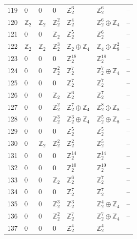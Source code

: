 \documentclass[10pt]{article}
\begin{document}
\begin{longtable}{rlllllr}
119 & $0$ & $0$ & $0$ & $\mathbb{Z}_{2}^{6}$ & $\mathbb{Z}_{2}^{6}$ & -- \\
120 & $\mathbb{Z}_{2}$ & $\mathbb{Z}_{2}$ & $\mathbb{Z}_{2}^{2}$ & $\mathbb{Z}_{2}^{4}$ & $\mathbb{Z}_{2}^{6}\oplus \mathbb{Z}_{4}$ & -- \\
121 & $0$ & $0$ & $\mathbb{Z}_{2}$ & $\mathbb{Z}_{2}^{5}$ & $\mathbb{Z}_{2}^{6}$ & -- \\
122 & $\mathbb{Z}_{2}$ & $\mathbb{Z}_{2}$ & $\mathbb{Z}_{2}^{3}$ & $\mathbb{Z}_{2}\oplus \mathbb{Z}_{4}$ & $\mathbb{Z}_{4}\oplus \mathbb{Z}_{8}^{2}$ & -- \\
123 & $0$ & $0$ & $0$ & $\mathbb{Z}_{2}^{18}$ & $\mathbb{Z}_{2}^{18}$ & -- \\
124 & $0$ & $0$ & $\mathbb{Z}_{2}^{2}$ & $\mathbb{Z}_{2}^{7}$ & $\mathbb{Z}_{2}^{7}\oplus \mathbb{Z}_{4}$ & -- \\
125 & $0$ & $0$ & $0$ & $\mathbb{Z}_{2}^{7}$ & $\mathbb{Z}_{2}^{7}$ & -- \\
126 & $0$ & $0$ & $\mathbb{Z}_{2}$ & $\mathbb{Z}_{2}^{6}$ & $\mathbb{Z}_{2}^{7}$ & -- \\
127 & $0$ & $0$ & $\mathbb{Z}_{2}^{2}$ & $\mathbb{Z}_{2}^{7}\oplus \mathbb{Z}_{4}$ & $\mathbb{Z}_{2}^{8}\oplus \mathbb{Z}_{8}$ & -- \\
128 & $0$ & $0$ & $\mathbb{Z}_{2}^{3}$ & $\mathbb{Z}_{2}^{3}\oplus \mathbb{Z}_{4}$ & $\mathbb{Z}_{2}^{5}\oplus \mathbb{Z}_{8}$ & -- \\
129 & $0$ & $0$ & $0$ & $\mathbb{Z}_{2}^{5}$ & $\mathbb{Z}_{2}^{5}$ & -- \\
130 & $0$ & $\mathbb{Z}_{2}$ & $\mathbb{Z}_{2}^{2}$ & $\mathbb{Z}_{2}^{2}$ & $\mathbb{Z}_{2}^{5}$ & -- \\
131 & $0$ & $0$ & $0$ & $\mathbb{Z}_{2}^{14}$ & $\mathbb{Z}_{2}^{14}$ & -- \\
132 & $0$ & $0$ & $0$ & $\mathbb{Z}_{2}^{10}$ & $\mathbb{Z}_{2}^{10}$ & -- \\
133 & $0$ & $0$ & $\mathbb{Z}_{2}$ & $\mathbb{Z}_{2}^{6}$ & $\mathbb{Z}_{2}^{7}$ & -- \\
134 & $0$ & $0$ & $0$ & $\mathbb{Z}_{2}^{7}$ & $\mathbb{Z}_{2}^{7}$ & -- \\
135 & $0$ & $0$ & $\mathbb{Z}_{2}^{3}$ & $\mathbb{Z}_{2}^{3}$ & $\mathbb{Z}_{2}^{4}\oplus \mathbb{Z}_{4}$ & -- \\
136 & $0$ & $0$ & $\mathbb{Z}_{2}^{2}$ & $\mathbb{Z}_{2}^{7}$ & $\mathbb{Z}_{2}^{7}\oplus \mathbb{Z}_{4}$ & -- \\
137 & $0$ & $0$ & $0$ & $\mathbb{Z}_{2}^{4}$ & $\mathbb{Z}_{2}^{4}$ & -- \\

\end{longtable}
\end{document}
